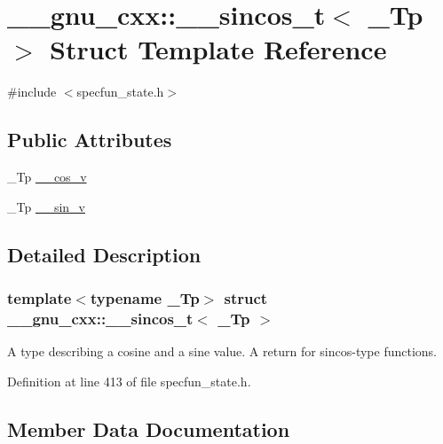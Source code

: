\hypertarget{struct____gnu__cxx_1_1____sincos__t}{}\section{\+\_\+\+\_\+gnu\+\_\+cxx\+:\+:\+\_\+\+\_\+sincos\+\_\+t$<$ \+\_\+\+Tp $>$ Struct Template Reference}
\label{struct____gnu__cxx_1_1____sincos__t}


{\ttfamily \#include $<$specfun\+\_\+state.\+h$>$}

\subsection*{Public Attributes}
\begin{DoxyCompactItemize}
\item 
\+\_\+\+Tp \hyperlink{struct____gnu__cxx_1_1____sincos__t_ae88c123c9c9b2d138fdaa43b0c1addb6}{\+\_\+\+\_\+cos\+\_\+v}
\item 
\+\_\+\+Tp \hyperlink{struct____gnu__cxx_1_1____sincos__t_a22a21d9a5658097549cbca39b891fd27}{\+\_\+\+\_\+sin\+\_\+v}
\end{DoxyCompactItemize}


\subsection{Detailed Description}
\subsubsection*{template$<$typename \+\_\+\+Tp$>$\newline
struct \+\_\+\+\_\+gnu\+\_\+cxx\+::\+\_\+\+\_\+sincos\+\_\+t$<$ \+\_\+\+Tp $>$}

A type describing a cosine and a sine value. A return for sincos-\/type functions. 

Definition at line 413 of file specfun\+\_\+state.\+h.



\subsection{Member Data Documentation}
\mbox{\label{struct____gnu__cxx_1_1____sincos__t_ae88c123c9c9b2d138fdaa43b0c1addb6}} 

